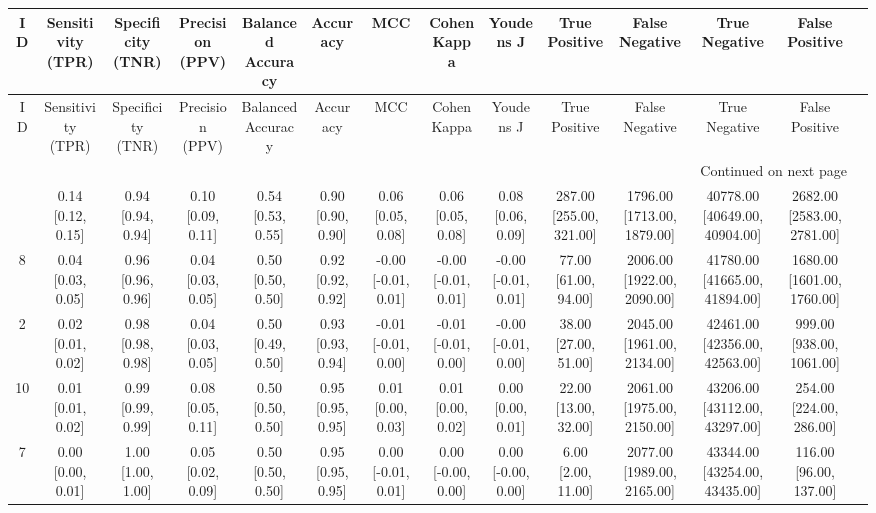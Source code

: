 \documentclass[8pt]{article}
\begin{document}
\begin{center}
\begin{footnotesize}
\begin{longtable}{|cccccccccccccc|}
\toprule
ID & Sensitivity (TPR) & Specificity (TNR) &   Precision (PPV) & Balanced Accuracy &          Accuracy &                 MCC &         Cohen Kappa &           Youdens J &           True Positive &             False Negative &                 True Negative &             False Positive \\
\midrule
\endfirsthead

\toprule
ID & Sensitivity (TPR) & Specificity (TNR) &   Precision (PPV) & Balanced Accuracy &          Accuracy &                 MCC &         Cohen Kappa &           Youdens J &           True Positive &             False Negative &                 True Negative &             False Positive \\
\midrule
\endhead
\midrule
\multicolumn{13}{r}{{Continued on next page}} \\
\midrule
\endfoot

\bottomrule
\endlastfoot
 5 & 0.14 [0.12, 0.15] & 0.94 [0.94, 0.94] & 0.10 [0.09, 0.11] & 0.54 [0.53, 0.55] & 0.90 [0.90, 0.90] &   0.06 [0.05, 0.08] &   0.06 [0.05, 0.08] &   0.08 [0.06, 0.09] & 287.00 [255.00, 321.00] & 1796.00 [1713.00, 1879.00] & 40778.00 [40649.00, 40904.00] & 2682.00 [2583.00, 2781.00] \\
 8 & 0.04 [0.03, 0.05] & 0.96 [0.96, 0.96] & 0.04 [0.03, 0.05] & 0.50 [0.50, 0.50] & 0.92 [0.92, 0.92] & -0.00 [-0.01, 0.01] & -0.00 [-0.01, 0.01] & -0.00 [-0.01, 0.01] &    77.00 [61.00, 94.00] & 2006.00 [1922.00, 2090.00] & 41780.00 [41665.00, 41894.00] & 1680.00 [1601.00, 1760.00] \\
 2 & 0.02 [0.01, 0.02] & 0.98 [0.98, 0.98] & 0.04 [0.03, 0.05] & 0.50 [0.49, 0.50] & 0.93 [0.93, 0.94] & -0.01 [-0.01, 0.00] & -0.01 [-0.01, 0.00] & -0.00 [-0.01, 0.00] &    38.00 [27.00, 51.00] & 2045.00 [1961.00, 2134.00] & 42461.00 [42356.00, 42563.00] &   999.00 [938.00, 1061.00] \\
10 & 0.01 [0.01, 0.02] & 0.99 [0.99, 0.99] & 0.08 [0.05, 0.11] & 0.50 [0.50, 0.50] & 0.95 [0.95, 0.95] &   0.01 [0.00, 0.03] &   0.01 [0.00, 0.02] &   0.00 [0.00, 0.01] &    22.00 [13.00, 32.00] & 2061.00 [1975.00, 2150.00] & 43206.00 [43112.00, 43297.00] &    254.00 [224.00, 286.00] \\
 7 & 0.00 [0.00, 0.01] & 1.00 [1.00, 1.00] & 0.05 [0.02, 0.09] & 0.50 [0.50, 0.50] & 0.95 [0.95, 0.95] &  0.00 [-0.01, 0.01] &  0.00 [-0.00, 0.00] &  0.00 [-0.00, 0.00] &      6.00 [2.00, 11.00] & 2077.00 [1989.00, 2165.00] & 43344.00 [43254.00, 43435.00] &     116.00 [96.00, 137.00] \\
\end{longtable}
\end{footnotesize}
\end{center}
\end{document}
